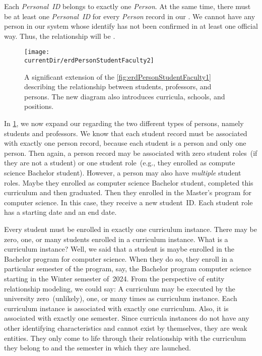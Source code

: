 Each \emph{Personal~ID} belongs to exactly one \emph{Person}.
At the same time, there must be at least one \emph{Personal~ID} for every \emph{Person} record in our \db.
We cannot have any person in our system whose identify has not been confirmed in at least one official way.
Thus, the relationship will be .

\begin{figure}%
\centering%
\texttt{[image: \\currentDir/erdPersonStudentFaculty2]}%
\caption{A significant extension of the \cref{fig:erdPersonStudentFaculty1}  describing the relationship between students, professors, and persons. %
The new diagram also introduces curricula, schools, and positions.}%
\label{fig:erdPersonStudentFaculty2}%
\end{figure}%

In \cref{fig:erdPersonStudentFaculty2}, we now expand our  regarding the two different types of persons, namely students and professors.
We know that each student record must be associated with exactly one person record, because each student is a person and only one person.
Then again, a person record may be associated with zero student roles~(if they are not a student) or one student role~(e.g., they enrolled as compute science Bachelor student).
However, a person may also have \emph{multiple} student roles.
Maybe they enrolled as computer science Bachelor student, completed this curriculum and then graduated.
Then they enrolled in the Master's program for computer science.
In this case, they receive a new student~ID.
Each student role has a starting date and an end date.

Every student must be enrolled in exactly one curriculum instance.
There may be zero, one, or many students enrolled in a curriculum instance.
What is a curriculum instance?
Well, we said that a student is maybe enrolled in the Bachelor program for computer science.
When they do so, they enroll in a particular semester of the program, say, the Bachelor program computer science starting in the Winter semester of~2024.
From the perspective of entity relationship modeling, we could say:
A curriculum may be executed by the university zero~(unlikely), one, or many times as curriculum instance.
Each curriculum instance is associated with exactly one curriculum.
Also, it is associated with exactly one semester.
Since curricula instances do not have any other identifying characteristics and cannot exist by themselves, they are weak entities.
They only come to life through their relationship with the curriculum they belong to and the semester in which they are launched.

